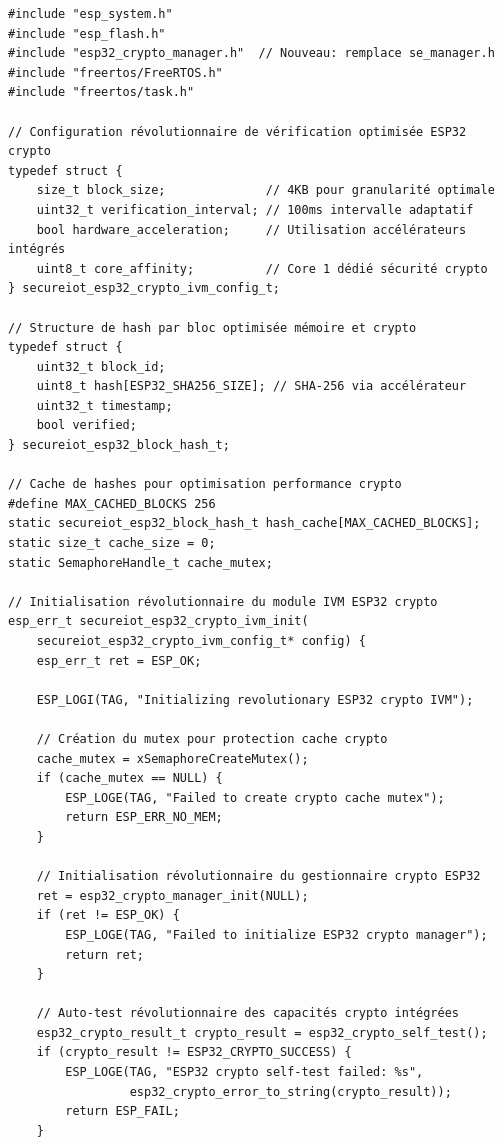 \lstset{language=C}
\begin{lstlisting}[caption={Implémentation révolutionnaire IVM exploitant ESP32 crypto intégré}]
#include "esp_system.h"
#include "esp_flash.h"
#include "esp32_crypto_manager.h"  // Nouveau: remplace se_manager.h
#include "freertos/FreeRTOS.h"
#include "freertos/task.h"

// Configuration révolutionnaire de vérification optimisée ESP32 crypto
typedef struct {
    size_t block_size;              // 4KB pour granularité optimale
    uint32_t verification_interval; // 100ms intervalle adaptatif
    bool hardware_acceleration;     // Utilisation accélérateurs intégrés
    uint8_t core_affinity;          // Core 1 dédié sécurité crypto
} secureiot_esp32_crypto_ivm_config_t;

// Structure de hash par bloc optimisée mémoire et crypto
typedef struct {
    uint32_t block_id;
    uint8_t hash[ESP32_SHA256_SIZE]; // SHA-256 via accélérateur
    uint32_t timestamp;
    bool verified;
} secureiot_esp32_block_hash_t;

// Cache de hashes pour optimisation performance crypto
#define MAX_CACHED_BLOCKS 256
static secureiot_esp32_block_hash_t hash_cache[MAX_CACHED_BLOCKS];
static size_t cache_size = 0;
static SemaphoreHandle_t cache_mutex;

// Initialisation révolutionnaire du module IVM ESP32 crypto
esp_err_t secureiot_esp32_crypto_ivm_init(
    secureiot_esp32_crypto_ivm_config_t* config) {
    esp_err_t ret = ESP_OK;
    
    ESP_LOGI(TAG, "Initializing revolutionary ESP32 crypto IVM");
    
    // Création du mutex pour protection cache crypto
    cache_mutex = xSemaphoreCreateMutex();
    if (cache_mutex == NULL) {
        ESP_LOGE(TAG, "Failed to create crypto cache mutex");
        return ESP_ERR_NO_MEM;
    }
    
    // Initialisation révolutionnaire du gestionnaire crypto ESP32
    ret = esp32_crypto_manager_init(NULL);
    if (ret != ESP_OK) {
        ESP_LOGE(TAG, "Failed to initialize ESP32 crypto manager");
        return ret;
    }
    
    // Auto-test révolutionnaire des capacités crypto intégrées
    esp32_crypto_result_t crypto_result = esp32_crypto_self_test();
    if (crypto_result != ESP32_CRYPTO_SUCCESS) {
        ESP_LOGE(TAG, "ESP32 crypto self-test failed: %s", 
                 esp32_crypto_error_to_string(crypto_result));
        return ESP_FAIL;
    }
    

\end{lstlisting}
